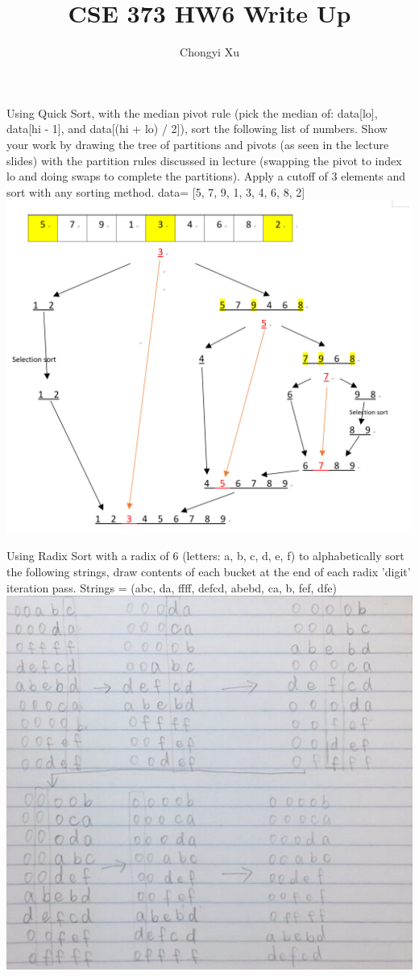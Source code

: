 \documentclass[]{exam}
\title{}
\title{CSE 373 HW6 Write Up}
\author{Chongyi Xu}
\begin{document}
	
\maketitle
\begin{questions}
\question Using Quick Sort, with the median pivot rule (pick the median of: data[lo], data[hi - 1], and data[(hi + lo) / 2]), sort the following list of numbers. Show your work by drawing the tree of partitions and pivots (as seen in the lecture slides) with the partition rules discussed in lecture (swapping the pivot to index lo and doing swaps to complete the partitions). Apply a cutoff of 3 elements and sort with any sorting method. 
data= [5, 7, 9, 1, 3, 4, 6, 8, 2]
\\
\includegraphics[scale = 0.2]{1.png}

\question Using Radix Sort with a radix of 6 (letters: a, b, c, d, e, f) to alphabetically sort the following strings, draw contents of each bucket at the end of each radix 'digit' iteration pass. 
Strings = (abc, da, ffff, defcd, abebd, ca, b, fef, dfe)
\\
\includegraphics[scale = 0.4]{3.png}
\end{questions}
\end{document}
